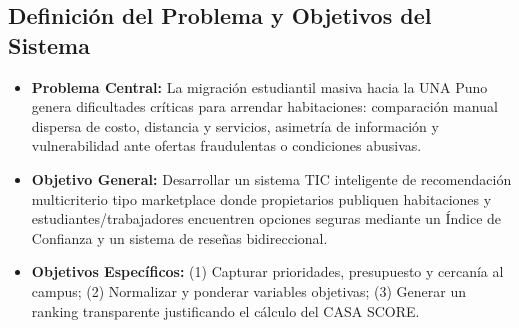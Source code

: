\documentclass[11pt,a4paper]{article}
\begin{document}
\subsection{Definición del Problema y Objetivos del Sistema}
\begin{itemize}[leftmargin=*]
    \item \textbf{Problema Central:} La migración estudiantil masiva hacia la UNA Puno genera dificultades críticas para arrendar habitaciones: comparación manual dispersa de costo, distancia y servicios, asimetría de información y vulnerabilidad ante ofertas fraudulentas o condiciones abusivas.
    \item \textbf{Objetivo General:} Desarrollar un sistema TIC inteligente de recomendación multicriterio tipo marketplace donde propietarios publiquen habitaciones y estudiantes/trabajadores encuentren opciones seguras mediante un Índice de Confianza y un sistema de reseñas bidireccional.
    \item \textbf{Objetivos Específicos:} (1) Capturar prioridades, presupuesto y cercanía al campus; (2) Normalizar y ponderar variables objetivas; (3) Generar un ranking transparente justificando el cálculo del CASA SCORE.
\end{itemize}
\end{document}
